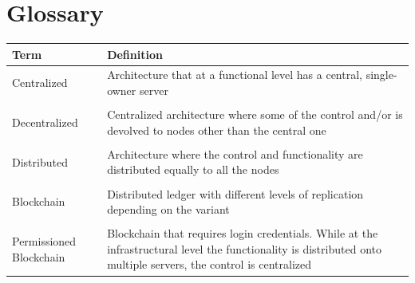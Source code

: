 \section{Glossary}\label{section-glossary}

{\small
\begin{longtable}[]{@{}ll@{}}
\toprule
\begin{minipage}[b]{0.2\columnwidth}\raggedright\strut
\textbf{Term}\strut
\end{minipage} & \begin{minipage}[b]{0.77\columnwidth}\raggedright\strut
\textbf{Definition}\strut
\end{minipage}\tabularnewline
\midrule
\endhead
\begin{minipage}[t]{0.2\columnwidth}\raggedright\strut
Centralized
\strut
\end{minipage} & \begin{minipage}[t]{0.77\columnwidth}\raggedright\strut
Architecture that at a functional level has a central, single-owner server
\strut
\end{minipage}
\tabularnewline\tabularnewline
\begin{minipage}[t]{0.2\columnwidth}\raggedright\strut
Decentralized
\strut
\end{minipage} & \begin{minipage}[t]{0.77\columnwidth}\raggedright\strut
Centralized architecture where some of the control and/or is devolved to nodes other than the central one
\strut
\end{minipage}
\tabularnewline\tabularnewline
\begin{minipage}[t]{0.2\columnwidth}\raggedright\strut
Distributed
\strut
\end{minipage} & \begin{minipage}[t]{0.77\columnwidth}\raggedright\strut
Architecture where the control and functionality are distributed equally to all the nodes
\strut
\end{minipage}

\tabularnewline\tabularnewline
\begin{minipage}[t]{0.2\columnwidth}\raggedright\strut
Blockchain
\strut
\end{minipage} & \begin{minipage}[t]{0.77\columnwidth}\raggedright\strut
Distributed ledger with different levels of replication depending on the variant
\strut
\end{minipage}

\tabularnewline\tabularnewline
\begin{minipage}[t]{0.2\columnwidth}\raggedright\strut
Permissioned Blockchain
\strut
\end{minipage} & \begin{minipage}[t]{0.77\columnwidth}\raggedright\strut
Blockchain that requires login credentials. While at the infrastructural level the functionality is distributed onto multiple servers, the control is centralized
\strut
\end{minipage}


\end{longtable}}
